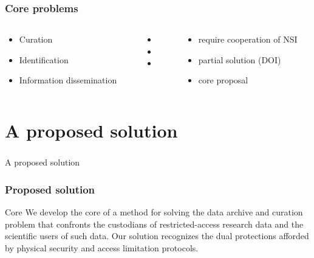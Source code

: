\begin{frame}
\frametitle{Core problems}
\begin{columns}
  \begin{column}{0.3\textwidth}
    \begin{itemize}[<+->]
\item Curation\newline
\item Identification\newline
\item Information dissemination
    \end{itemize}
  \end{column}
  \begin{column}{0.25\textwidth}
  \begin{itemize}
  \item[\ ]\newline
  \item[\ ]\newline
  \item[\ ]\newline
  \end{itemize}
  \end{column}
  \begin{column}{0.4\textwidth}
     \begin{itemize}[<+->]
        \item require cooperation of NSI
        \item partial solution (DOI)\newline
        \item core proposal\newline
     \end{itemize}
  \end{column}
\end{columns}
\end{frame}


\section[Solution]{A proposed solution}
\begin{frame}
\frametitle{}
\begin{block}{A proposed solution}

\end{block}
\end{frame}

\begin{frame}
\frametitle{Proposed solution}
\begin{block}{Core}
We develop the core of a method for solving the data archive
and curation problem that confronts the custodians of restricted-access
research data and the scientific users of such data. Our solution recognizes 
the dual protections afforded by physical security and access limitation protocols.
\end{block}
\end{frame}

